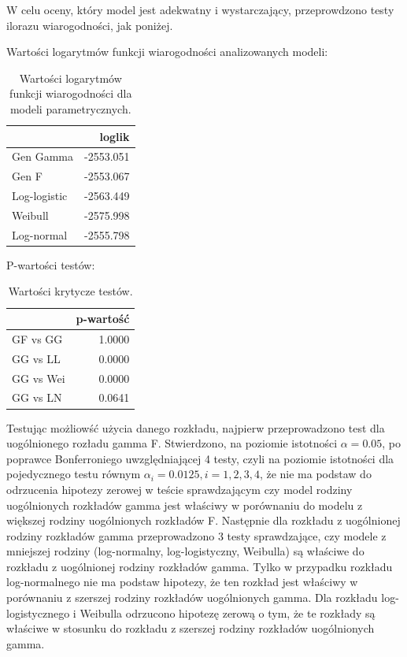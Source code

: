 \documentclass[]{article}
\begin{document}
W celu oceny, który model jest adekwatny i wystarczający, przeprowdzono
testy ilorazu wiarogodności, jak poniżej.

Wartości logarytmów funkcji wiarogodności analizowanych modeli:

\begin{table}[hbt!]
\centering
\begin{tabular}{lr}
\toprule%
  & loglik\\ \toprule%

Gen Gamma & -2553.051\\

Gen F & -2553.067\\

Log-logistic & -2563.449\\

Weibull & -2575.998\\

Log-normal & -2555.798\\
\bottomrule
\end{tabular}
\caption{Wartości logarytmów funkcji wiarogodności dla modeli parametrycznych.}
\end{table}

P-wartości testów:

\begin{table}[hbt!]
\centering
\begin{tabular}{lr}
\toprule%
  & p-wartość\\
\toprule%
GF vs GG & 1.0000\\

GG vs LL & 0.0000\\

GG vs Wei & 0.0000\\

GG vs LN & 0.0641\\
\bottomrule
\end{tabular}
\caption{Wartości krytycze testów.}
\end{table}

Testując możliowść użycia danego rozkładu, najpierw przeprowadzono test
dla uogólnionego rozładu gamma  F. Stwierdzono, na
poziomie istotności \(\alpha=0.05\), po poprawce Bonferroniego
uwzględniającej 4 testy, czyli na poziomie istotności dla pojedycznego
testu równym \(\alpha_i = 0.0125, i =1,2,3,4\), że nie ma podstaw do
odrzucenia hipotezy zerowej w teście sprawdzającym czy model
 rodziny uogólnionych rozkładów gamma jest właściwy w
porównaniu do modelu z większej rodziny uogólnionych rozkładów F.
Następnie dla rozkładu z uogólnionej rodziny rozkładów gamma
przeprowadzono 3 testy sprawdzające, czy modele z mniejszej rodziny
(log-normalny, log-logistyczny, Weibulla) są właściwe
 do rozkładu z uogólnionej rodziny rozkładów gamma.
Tylko w przypadku rozkładu log-normalnego nie ma podstaw
 hipotezy, że ten rozkład jest właściwy w porównaniu
 z szerszej rodziny rozkładów uogólnionych gamma. Dla
rozkładu log-logistycznego i Weibulla odrzucono hipotezę zerową o tym,
że te rozkłady są właściwe w stosunku do rozkładu z szerszej rodziny
rozkładów uogólnionych gamma.
\end{document}
